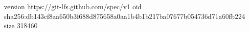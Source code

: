 version https://git-lfs.github.com/spec/v1
oid sha256:db143cf8aa650b3f688d875658a0aa1b4b1b217ba07677b054736d71a60fb224
size 318460
